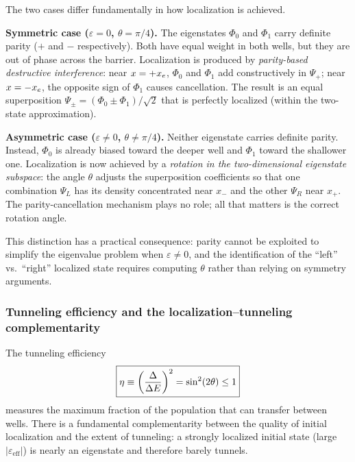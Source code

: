 The two cases differ fundamentally in how localization is achieved.

\textbf{Symmetric case ($\varepsilon = 0$, $\theta = \pi/4$).}
The eigenstates $\Phi_0$ and $\Phi_1$ carry definite parity ($+$ and $-$ respectively).
Both have equal weight in both wells, but they are out of phase across the barrier.
Localization is produced by \emph{parity-based destructive interference}: near $x = +x_e$,
$\Phi_0$ and $\Phi_1$ add constructively in $\Psi_+$; near $x = -x_e$, the opposite
sign of $\Phi_1$ causes cancellation.  The result is an equal superposition
$\Psi_\pm = (\Phi_0 \pm \Phi_1)/\sqrt{2}$ that is perfectly localized (within the
two-state approximation).

\textbf{Asymmetric case ($\varepsilon \neq 0$, $\theta \neq \pi/4$).}
Neither eigenstate carries definite parity. Instead, $\Phi_0$ is already biased toward
the deeper well and $\Phi_1$ toward the shallower one.  Localization is now achieved by a
\emph{rotation in the two-dimensional eigenstate subspace}: the angle $\theta$ adjusts
the superposition coefficients so that one combination $\Psi_L$ has its density concentrated
near $x_-$ and the other $\Psi_R$ near $x_+$. The parity-cancellation mechanism plays no
role; all that matters is the correct rotation angle.

This distinction has a practical consequence: parity cannot be exploited to simplify the
eigenvalue problem when $\varepsilon \neq 0$, and the identification of the ``left'' vs.\
``right'' localized state requires computing $\theta$ rather than relying on symmetry arguments.

\subsubsection{Tunneling efficiency and the localization--tunneling complementarity}

The tunneling efficiency
\begin{equation}\label{eq:eta_tun}
  \boxed{\eta \equiv \left(\frac{\Delta}{\Delta E}\right)^2 = \sin^2(2\theta) \leq 1}
\end{equation}
measures the maximum fraction of the population that can transfer between wells.
There is a fundamental complementarity between the quality of initial localization and
the extent of tunneling: a strongly localized initial state (large $|\varepsilon_{\text{eff}}|$)
is nearly an eigenstate and therefore barely tunnels.

